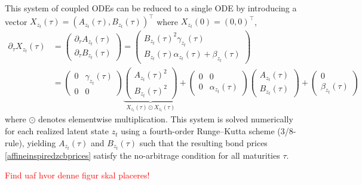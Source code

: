 This system of coupled ODEs can be reduced to a single ODE by introducing a vector $X_{z_t}(\tau)=(A_{z_t}(\tau),B_{z_t}(\tau))^\top$ where $X_{z_t}(0)=(0,0)^\top$,
\begin{align*}
    \partial_{\tau}X_{z_t}(\tau)&=
    \begin{pmatrix}
     \partial_{\tau}A_{z_t}(\tau)\\
     \partial_{\tau}B_{z_t}(\tau)   
    \end{pmatrix}=\begin{pmatrix}
     B_{z_t}(\tau)^2\gamma_{z_t}(\tau)\\
     B_{z_t}(\tau)\alpha_{z_t}(\tau)+\beta_{z_t}(\tau)  
    \end{pmatrix}\\
    &=\begin{pmatrix}
        0 & \gamma_{z_t}(\tau)\\
        0 & 0
    \end{pmatrix}
    \underbrace{\begin{pmatrix}
     A_{z_t}(\tau)^2\\
     B_{z_t}(\tau)^2   
    \end{pmatrix}}_{X_{z_t}(\tau)\odot X_{z_t}(\tau) }+
    \begin{pmatrix}
        0 & 0\\
        0 & \alpha_{z_t}(\tau)
    \end{pmatrix}
    \begin{pmatrix}
     A_{z_t}(\tau)\\
     B_{z_t}(\tau)   
    \end{pmatrix}+
    \begin{pmatrix}
     0\\
     \beta_{z_t}(\tau)   
    \end{pmatrix}
\end{align*}
where $\odot$ denotes elementwise multiplication. This system is solved numerically for each realized latent state $z_t$ using a fourth-order Runge--Kutta scheme (3/8-rule), yielding $A_{z_t}(\tau)$ and $B_{z_t}(\tau)$ such that the resulting bond prices \eqref{affineinspiredzcbprices} satisfy the no-arbitrage condition for all maturities $\tau$.


\textcolor{red}{Find uaf hvor denne figur skal placeres!}

